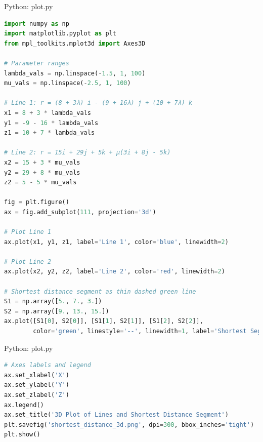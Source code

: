 \documentclass{beamer}
\numberwithin{equation}{section}
\theoremstyle{remark}
\begin{document}
\begin{frame}[fragile]{Python: plot.py}
\begin{lstlisting}[language=Python]
import numpy as np
import matplotlib.pyplot as plt
from mpl_toolkits.mplot3d import Axes3D

# Parameter ranges
lambda_vals = np.linspace(-1.5, 1, 100)
mu_vals = np.linspace(-2.5, 1, 100)

# Line 1: r = (8 + 3λ) i - (9 + 16λ) j + (10 + 7λ) k
x1 = 8 + 3 * lambda_vals
y1 = -9 - 16 * lambda_vals
z1 = 10 + 7 * lambda_vals

# Line 2: r = 15i + 29j + 5k + μ(3i + 8j - 5k)
x2 = 15 + 3 * mu_vals
y2 = 29 + 8 * mu_vals
z2 = 5 - 5 * mu_vals

fig = plt.figure()
ax = fig.add_subplot(111, projection='3d')

# Plot Line 1
ax.plot(x1, y1, z1, label='Line 1', color='blue', linewidth=2)

# Plot Line 2
ax.plot(x2, y2, z2, label='Line 2', color='red', linewidth=2)

# Shortest distance segment as thin dashed green line
S1 = np.array([5., 7., 3.])
S2 = np.array([9., 13., 15.])
ax.plot([S1[0], S2[0]], [S1[1], S2[1]], [S1[2], S2[2]],
        color='green', linestyle='--', linewidth=1, label='Shortest Segment')
\end{lstlisting}
\end{frame} 

\begin{frame}[fragile]{Python: plot.py}
\begin{lstlisting}[language=Python]
# Axes labels and legend
ax.set_xlabel('X')
ax.set_ylabel('Y')
ax.set_zlabel('Z')
ax.legend()
ax.set_title('3D Plot of Lines and Shortest Distance Segment')
plt.savefig('shortest_distance_3d.png', dpi=300, bbox_inches='tight')
plt.show()

\end{lstlisting}
\end{frame} 
\end{document}
